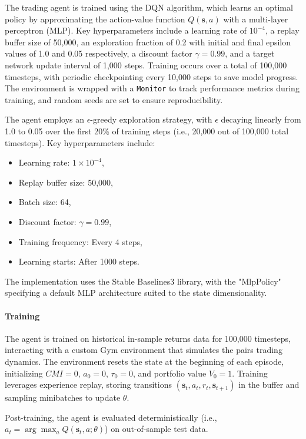 The trading agent is trained using the DQN algorithm, which learns an optimal policy by approximating the action-value function $Q(\mathbf{s}, a)$ with a multi-layer perceptron (MLP). Key hyperparameters include a learning rate of $10^{-4}$, a replay buffer size of 50,000, an exploration fraction of 0.2 with initial and final epsilon values of 1.0 and 0.05 respectively, a discount factor $\gamma = 0.99$, and a target network update interval of 1,000 steps. Training occurs over a total of 100,000 timesteps, with periodic checkpointing every 10,000 steps to save model progress. The environment is wrapped with a \texttt{Monitor} to track performance metrics during training, and random seeds are set to ensure reproducibility.

The agent employs an $\epsilon$-greedy exploration strategy, with $\epsilon$ decaying linearly from 1.0 to 0.05 over the first 20\% of training steps (i.e., 20,000 out of 100,000 total timesteps). Key hyperparameters include:
\begin{itemize}[leftmargin=*]
    \item Learning rate: $1 \times 10^{-4}$,
    \item Replay buffer size: 50,000,
    \item Batch size: 64,
    \item Discount factor: $\gamma = 0.99$,
    \item Training frequency: Every 4 steps,
    \item Learning starts: After 1000 steps.
\end{itemize}
The implementation uses the Stable Baselines3 library, with the "MlpPolicy" specifying a default MLP architecture suited to the state dimensionality.

\paragraph{Training}
The agent is trained on historical in-sample returns data for 100,000 timesteps, interacting with a custom Gym environment that simulates the pairs trading dynamics. The environment resets the state at the beginning of each episode, initializing $CMI = 0$, $a_0 = 0$, $\tau_0 = 0$, and portfolio value $V_0 = 1$. Training leverages experience replay, storing transitions $(\mathbf{s}_t, a_t, r_t, \mathbf{s}_{t+1})$ in the buffer and sampling minibatches to update $\theta$.

Post-training, the agent is evaluated deterministically (i.e., $a_t = \arg\max_a Q(\mathbf{s}_t, a; \theta)$) on out-of-sample test data. 

